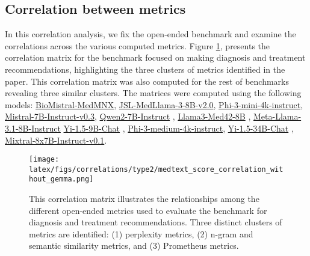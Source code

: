 \clearpage
\subsection{Correlation between metrics}\label{apx:bench_across_metrics}

In this correlation analysis, we fix the open-ended benchmark and examine the correlations across the various computed metrics. Figure \ref{fig:medtext_corr}, presents the correlation matrix for the benchmark focused on making diagnosis and treatment recommendations, highlighting the three clusters of metrics identified in the paper. This correlation matrix was also computed for the rest of benchmarks revealing three similar clusters. The matrices were computed using the following models: \href{https://huggingface.co/BioMistral/BioMistral-MedMNX}{BioMistral-MedMNX},  \href{https://huggingface.co/johnsnowlabs/JSL-MedLlama-3-8B-v2.0}{JSL-MedLlama-3-8B-v2.0}, \href{https://huggingface.co/microsoft/Phi-3-mini-4k-instruct}{Phi-3-mini-4k-instruct}, \href{https://huggingface.co/mistralai/Mistral-7B-Instruct-v0.3}{Mistral-7B-Instruct-v0.3}, \href{https://huggingface.co/Qwen/Qwen2-7B-Instruct}{Qwen2-7B-Instruct} \cite{qwen2}, \href{https://huggingface.co/m42-health/Llama3-Med42-8B}{Llama3-Med42-8B} \cite{christophe2024med42}, \href{https://huggingface.co/meta-llama/Meta-Llama-3-8B-Instruct}{Meta-Llama-3.1-8B-Instruct}\cite{llama3modelcard} \href{https://huggingface.co/01-ai/Yi-1.5-9B-Chat}{Yi-1.5-9B-Chat} \cite{young2024yi}, \href{https://huggingface.co/microsoft/Phi-3-medium-4k-instruct}{Phi-3-medium-4k-instruct}, \href{https://huggingface.co/01-ai/Yi-1.5-34B-Chat}{Yi-1.5-34B-Chat} \cite{young2024yi}, \href{https://huggingface.co/mistralai/Mixtral-8x7B-Instruct-v0.1}{Mixtral-8x7B-Instruct-v0.1}.



\begin{figure}[t]
    \centering
    \texttt{[image: latex/figs/correlations/type2/medtext\_score\_correlation\_without\_gemma.png]}
    \caption{This correlation matrix illustrates the relationships among the different open-ended metrics used to evaluate the benchmark for diagnosis and treatment recommendations. Three distinct clusters of metrics are identified: (1) perplexity metrics, (2) n-gram and semantic similarity metrics, and (3) Prometheus metrics.}
    \label{fig:medtext_corr}
\end{figure} 


